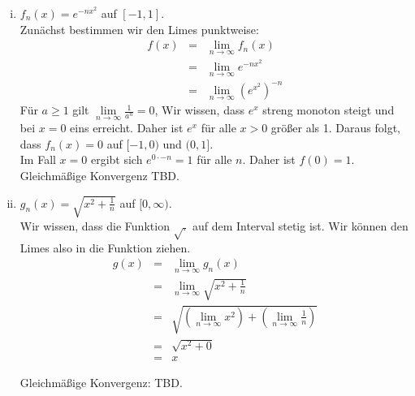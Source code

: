 \documentclass[11pt,a4paper,ngerman]{article}
\newcommand{\limes}[2][n]{\underset{ #1 \rightarrow #2}{\lim}}
\begin{document}
\begin{enumerate}[(i)]
    \item $f_n(x) = e^{-nx^2}$ auf $[-1,1]$.\\ 
        Zunächst bestimmen wir den Limes punktweise:\\
        $$\begin{array}{rcl}
            f(x) &=& \limes{\infty} f_n(x)\\
                &=& \limes{\infty} e^{-nx^2}\\
                &=& \limes{\infty} \left( e^{x^2}\right)^{-n}
        \end{array}$$
        Für $a \geq 1$ gilt $\limes{\infty}\frac{1}{a^n} = 0$,
        Wir wissen, dass $e^x$ streng monoton steigt und bei $x=0$ eins
        erreicht. Daher ist $e^x$ für alle $x>0$ größer als 1.
        Daraus folgt, dass $f_n(x) = 0$ auf $[-1,0)$ und $(0,1]$.\\
        Im Fall $x=0$ ergibt sich $e^{0 \cdot -n} = 1$ für alle $n$.
        Daher ist $f(0) = 1$.\\

        Gleichmäßige Konvergenz TBD.

    \item $g_n(x) = \sqrt{x^2 + \frac{1}{n}}$ auf $[0,\infty).$\\
        Wir wissen, dass die Funktion $\sqrt{.}$ auf dem Interval stetig ist.
        Wir können den Limes also in die Funktion ziehen.\\
        $$\begin{array}{rcl}
            g(x) &=& \limes{\infty} g_n(x)\\
                &=& \limes{\infty} \sqrt{x^2 + \frac{1}{n}}\\
                &=& \sqrt{(\limes{\infty} x^2) + (\limes{\infty} \frac{1}{n})}\\
                &=& \sqrt{x^2 + 0}\\
                &=& x
        \end{array}$$

        Gleichmäßige Konvergenz: TBD.


\end{enumerate}
\end{document}
